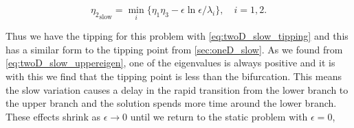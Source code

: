\begin{equation}\label{eq:twoD_slow_tipping}
{\eta_2}_{\text{slow}}= \min\limits_i\{\eta_1\eta_3-\epsilon\ln\epsilon/\lambda_i\},\quad i=1,2.
\end{equation}

Thus we have the tipping for this problem with \eqref{eq:twoD_slow_tipping} and this has a similar form to the tipping point from \autoref{sec:oneD_slow}. As we found from \eqref{eq:twoD_slow_uppereigen}, one of the eigenvalues is always positive and it is with this we find that the tipping point is less than the bifurcation. This means the slow variation causes a delay in the rapid transition from the lower branch to the upper branch and the solution spends more time around the lower branch. These effects shrink as $\epsilon\to 0$ until we return to the static problem with $\epsilon=0$,

